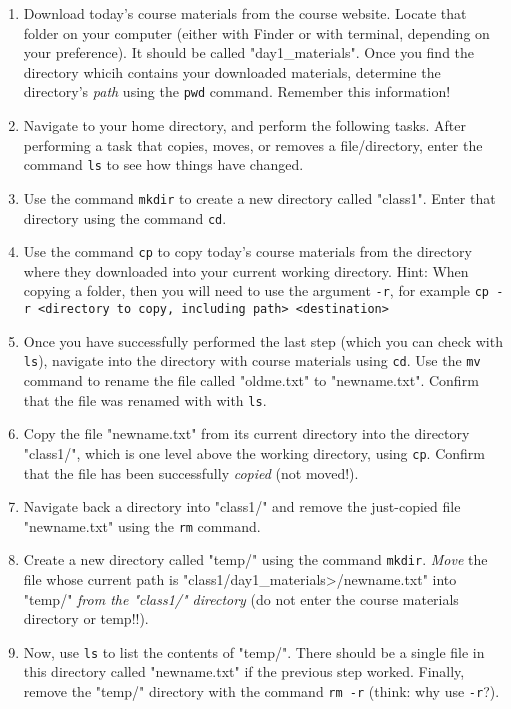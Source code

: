\documentclass{article}[12pt]
\newcommand{\code}[1]{\texttt{#1}}  %
\begin{document}
    \begin{enumerate}
        \item Download today's course materials from the course website. Locate that folder on your computer (either with Finder or with terminal, depending on your preference). It should be called "day1\_materials". Once you find the directory whicih contains your downloaded materials, determine the directory's \emph{path} using the \code{pwd} command. Remember this information!
    
        \item Navigate to your home directory, and perform the following tasks. After performing a task that copies, moves, or removes a file/directory, enter the command \code{ls} to see how things have changed.
    
        \item Use the command \code{mkdir} to create a new directory called "class1". Enter that directory using the command \code{cd}.
                        
        \item Use the command \code{cp} to copy today's course materials from the directory where they downloaded into your current working directory. Hint: When copying a folder, then you will need to use the argument \code{-r}, for example \code{cp -r <directory to copy, including path> <destination>}
        
        \item Once you have successfully performed the last step (which you can check with \code{ls}), navigate into the directory with course materials using \code{cd}. Use the \code{mv} command to rename the file called "oldme.txt" to "newname.txt". Confirm that the file was renamed with with \code{ls}.
        
        \item Copy the file "newname.txt" from its current directory into the directory "class1/", which is one level above the working directory, using \code{cp}. Confirm that the file has been successfully \emph{copied} (not moved!).
        
        \item Navigate back a directory into "class1/" and remove the just-copied file "newname.txt" using the \code{rm} command.
        
        \item Create a new directory called "temp/" using the command \code{mkdir}. \emph{Move} the file whose current path is "class1/day1\_materials>/newname.txt" into "temp/" \emph{from the "class1/" directory} (do not enter the course materials directory or temp!!). 
        
        \item Now, use \code{ls} to list the contents of "temp/". There should be a single file in this directory called "newname.txt" if the previous step worked. Finally, remove the "temp/" directory with the command \code{rm -r} (think: why use \code{-r}?).        
        
    \end{enumerate} 
\end{document}
